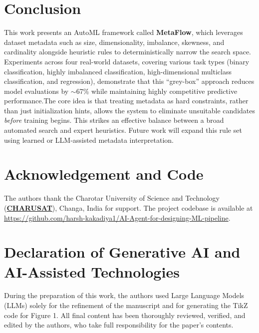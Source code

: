\documentclass[runningheads]{llncs}
\begin{document}
\section{Conclusion}
\label{sec:conclusion}

This work presents an AutoML framework called \textbf{MetaFlow}, which leverages dataset metadata such as size, dimensionality, imbalance, skewness, and cardinality alongside heuristic rules to deterministically narrow the search space. Experiments across four real-world datasets, covering various task types (binary classification, highly imbalanced classification, high-dimensional multiclass classification, and regression), demonstrate that this ``grey-box'' approach reduces model evaluations by $\sim$67\% while maintaining highly competitive predictive performance.The core idea is that treating metadata as hard constraints, rather than just initialization hints, allows the system to eliminate unsuitable candidates \emph{before} training begins. This strikes an effective balance between a broad automated search and expert heuristics. Future work will expand this rule set using learned or LLM-assisted metadata interpretation.

\section*{Acknowledgement and Code}

The authors thank the Charotar University of Science and Technology (\href{https://www.charusat.ac.in/}{\textbf{CHARUSAT}}), Changa, India for support. The project codebase is available at \url{https://github.com/harsh-kakadiya1/AI-Agent-for-designing-ML-pipeline}.

\section*{Declaration of Generative AI and AI-Assisted Technologies}
During the preparation of this work, the authors used Large Language Models (LLMs) solely for the refinement of the manuscript and for generating the TikZ code for Figure 1. All final content has been thoroughly reviewed, verified, and edited by the authors, who take full responsibility for the paper's contents.

\section*{}
\begingroup
\let\clearpage\relax

\setlength{\bibsep}{1.5pt plus 0.3pt}

\endgroup
\end{document}
